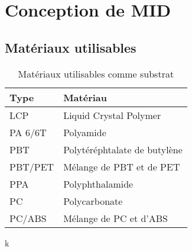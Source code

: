 
\section{Conception de MID}
\subsection{Matériaux utilisables}

\begin{table}[h]
\centering
\begin{tabular}{l l}
\toprule 
Type & Matériau \\
\midrule %
LCP & Liquid Crystal Polymer \\
PA 6/6T & Polyamide \\
PBT & Polytéréphtalate de butylène \\
PBT/PET & Mélange de PBT et de PET \\
PPA & Polyphthalamide \\
PC & Polycarbonate \\
PC/ABS & Mélange de PC et d'ABS \\ 
\bottomrule 
\end{tabular}
\caption{Matériaux utilisables comme substrat}
\label{tab:mid-materials}
\end{table}
k
